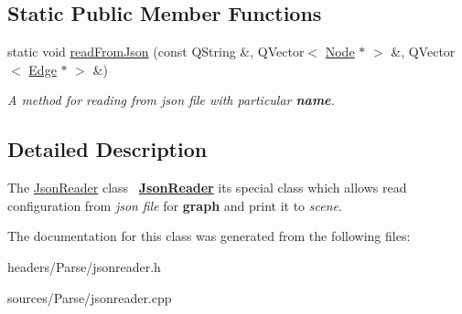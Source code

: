 \subsection*{Static Public Member Functions}
\begin{DoxyCompactItemize}
\item 
\mbox{\label{class_json_reader_ae9da7a1b6023d98f7fae1ae6d3f5a061}} 
static void \mbox{\hyperlink{class_json_reader_ae9da7a1b6023d98f7fae1ae6d3f5a061}{read\+From\+Json}} (const Q\+String \&, Q\+Vector$<$ \mbox{\hyperlink{class_node}{Node}} $\ast$ $>$ \&, Q\+Vector$<$ \mbox{\hyperlink{class_edge}{Edge}} $\ast$ $>$ \&)
\begin{DoxyCompactList}\small\item\em A {\itshape method} for reading from {\itshape json} {\itshape file} with particular {\bfseries{name}}. \end{DoxyCompactList}\end{DoxyCompactItemize}


\subsection{Detailed Description}
The \mbox{\hyperlink{class_json_reader}{Json\+Reader}} class~\newline
{\bfseries{\mbox{\hyperlink{class_json_reader}{Json\+Reader}}}} it\textquotesingle{}s special class which allows read configuration from {\itshape json} {\itshape file} for {\bfseries{graph}} and print it to {\itshape scene}. 

The documentation for this class was generated from the following files\+:\begin{DoxyCompactItemize}
\item 
headers/\+Parse/jsonreader.\+h\item 
sources/\+Parse/jsonreader.\+cpp\end{DoxyCompactItemize}
